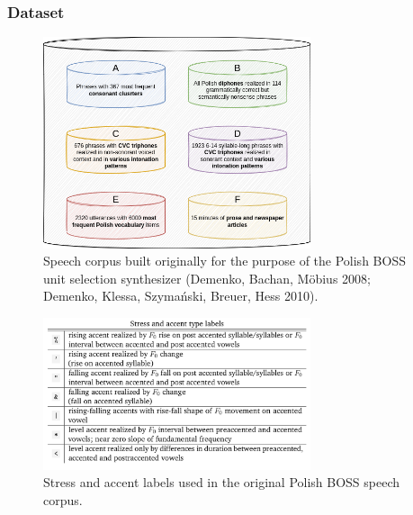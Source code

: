\documentclass[a4paper,9pt]{beamer}
\theoremstyle{mytheoremstyle}
\begin{document}
\begin{frame}
\frametitle{Dataset}
\begin{figure}
\begin{center}
  \includegraphics[width=0.7\textwidth]{res/dataset_structure}
\end{center}
	\caption{Speech corpus built originally for the purpose of the Polish BOSS unit selection synthesizer (Demenko, Bachan, M{\"o}bius 2008; Demenko, Klessa, Szyma\'nski, Breuer, Hess 2010).}
\end{figure}
\end{frame}

\begin{frame}
\begin{figure}
\begin{center}
  \includegraphics[width=0.7\textwidth]{res/stress_accent_labels}
\end{center}
	\caption{Stress and accent labels used in the original Polish BOSS speech corpus.}
\end{figure}
\end{frame}
\end{document}
